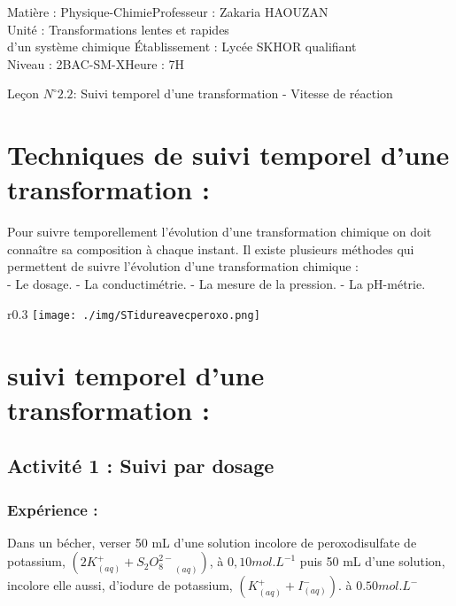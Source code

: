 \documentclass[12pt]{article}
\author{Zakaria HAOUZAN}
\date{\today}
\newcommand\headerMe[2]{\noindent{}#1\hfill#2}
\begin{document}
\headerMe{Matière : Physique-Chimie}{Professeur : Zakaria HAOUZAN}\\
\headerMe{Unité : Transformations lentes et rapides\\ d'un système chimique }{Établissement : Lycée SKHOR qualifiant}\\
\headerMe{Niveau : 2BAC-SM-X}{Heure : 7H}\\


\begin{center}
	\Large{Leçon $N^{\circ} 2.2 $: \color{red} Suivi temporel d’une transformation - Vitesse de réaction }
\end{center}

\section{Techniques de suivi temporel d'une transformation :}

Pour suivre temporellement l'évolution d'une transformation chimique on doit connaître sa composition à chaque instant.
Il existe plusieurs méthodes qui permettent de suivre l'évolution d'une transformation chimique :
\\- Le dosage.
- La conductimétrie.
- La mesure de la pression.
- La pH-métrie.

\begin{wrapfigure}[1]{r}{0.3\textwidth}
	\vspace{-3cm}
	\texttt{[image: ./img/STidureavecperoxo.png]}
\end{wrapfigure}



\section{suivi temporel d'une transformation :  }
\subsection{Activité 1 : Suivi par dosage }
\subsubsection{Expérience : }
Dans un bécher, verser 50 mL d'une solution incolore de peroxodisulfate de potassium,
$(2K^+_{(aq)} + {S_2O_8^{2-}}_{(aq)})$, à $0,10 mol.L^{-1}$ puis 50 mL d'une solution, incolore elle aussi, d'iodure de potassium, $(K^+_{(aq)} +I^-_{(aq)})$.
à $0.50 mol.L^-$
\end{document}
